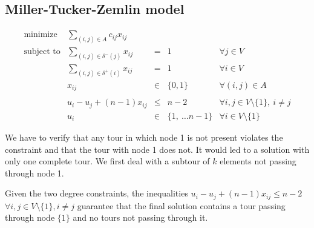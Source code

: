 \subsection{Miller-Tucker-Zemlin model}
\begin{equation*}
    \begin{array}{lrllr}
        \textrm{minimize}   & \displaystyle\sum_{(i, j) \in A} c_{ij}  x_{ij} \\
        \textrm{subject to} & \displaystyle\sum\limits_{(i, j) \in \delta^-(j)}  x_{ij} & = & 1 & \forall j \in V\\
                            & \displaystyle\sum\limits_{(i, j) \in \delta^+(i)}  x_{ij} & = & 1 & \forall i \in V\\
                            & x_{ij} & \in & \{0,1\} & \forall (i,j) \in A \\ \\
                            & u_i - u_j + (n-1) x_{ij} & \leq & n - 2 & \forall i, j \in V \setminus \{1\},\ i \neq j \\
                            & u_i & \in & \{1,\ \dots n-1\} & \forall i \in V \setminus \{1\}
    \end{array}
\end{equation*}

We have to verify that any tour in which node 1 is not present violates the
constraint and that the tour with node 1 does not. It would led to a solution
with only one complete tour. 
We first deal with a subtour of $k$ elements not passing through node 1.

\begin{theorem} 
    Given the two degree constraints, the inequalities $u_{i} -
    u_{j} + (n-1) x_{ij} \le n-2$ $\forall i,j\in V \setminus \{1\}, i\neq j$
    guarantee that the final solution contains a tour passing through node 
    $\{1\}$ and no tours not passing through it. 
\end{theorem}

